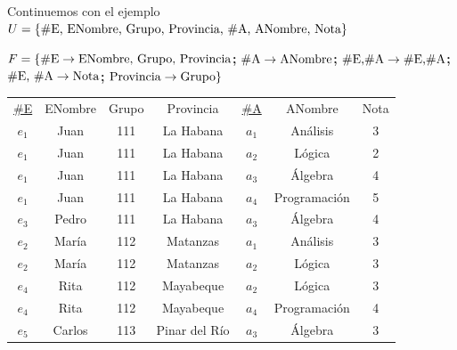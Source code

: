 \begin{frame}{Continuemos con el ejemplo}
        $U = \{ \textnormal{\#E, ENombre,  Grupo, Provincia, \#A, ANombre, Nota}\}$

        $F = \{\textnormal{\#E} \to \textnormal{ENombre, Grupo, Provincia}${\bf;}\; $\textnormal{\#A} \to \textnormal{ANombre}${\bf;}\; $\textnormal{\#E,\#A} \to \textnormal{\#E,\#A}${\bf;}\; $\textnormal{\#E, \#A} \to \textnormal{Nota}${\bf;}\; $\textnormal{Provincia} \to \textnormal{Grupo}\}$\\[4mm]

    \centering
    \begin{tabular}{ccccccc}
        \underline{\#E} & ENombre & Grupo & Provincia & \underline{\#A} & ANombre & Nota\\
        $e_1$ & Juan & {111} & { La Habana} & $a_1$ & An\'alisis & 3\\
        $e_1$ & Juan & {111} & { La Habana} & $a_2$ & L\'ogica & 2\\
        $e_1$ & Juan & {111} & { La Habana} & $a_3$ & \'Algebra & 4\\
        $e_1$ & Juan & {111} & { La Habana} & $a_4$ & Programaci\'on & 5\\
        $e_3$ & Pedro & {111} & { La Habana} & $a_3$ & \'Algebra & 4\\
        $e_2$ & Mar\'ia & {112} & { Matanzas} & $a_1$ & An\'alisis & 3\\
        $e_2$ & Mar\'ia &  {112} & { Matanzas} & $a_2$ & L\'ogica & 3\\
        $e_4$ & Rita &  {112} & { Mayabeque} & $a_2$ & L\'ogica & 3\\
        $e_4$ & Rita &  {112} & { Mayabeque} & $a_4$ & Programaci\'on & 4\\
        $e_5$ & Carlos &  {113} & { Pinar del R\'io} & $a_3$ & \'Algebra & 3
    \end{tabular}

\end{frame}

